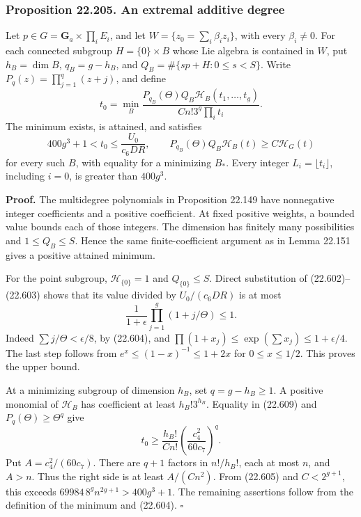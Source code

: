 \documentclass[
  11pt,
  a4paper,
]{article}
\begin{document}
\subsubsection{Proposition 22.205. An extremal additive
degree}\label{proposition-22.205.-an-extremal-additive-degree}

Let \(p\in G=\mathbf G_a\times\prod_iE_i\), and let
\(W=\{z_0=\sum_i\beta_i z_i\}\), with every \(\beta_i\ne0\). For each
connected subgroup \(H=\{0\}\times B\) whose Lie algebra is contained in
\(W\), put \(h_B=\dim B\), \(q_B=g-h_B\), and
\(Q_B=\#\{sp+H:0\le s<S\}\). Write \(P_q(z)=\prod_{j=1}^q(z+j)\), and
define \[
 t_0=\min_B
 \frac{P_{q_B}(\Theta)Q_B\mathcal H_B(t_1,\ldots,t_g)}
                 {C n!3^g\prod_i t_i}.
 \tag{22.608}
\] The minimum exists, is attained, and satisfies \[
 400g^3+1<t_0\le\frac{U_0}{c_6DR},\qquad
 P_{q_B}(\Theta)Q_B\mathcal H_B(t)\ge C\mathcal H_G(t)
 \tag{22.609}
\] for every such \(B\), with equality for a minimizing \(B_*\). Every
integer \(L_i=\lfloor t_i\rfloor\), including \(i=0\), is greater than
\(400g^3\).

\textbf{Proof.} The multidegree polynomials in Proposition 22.149 have
nonnegative integer coefficients and a positive coefficient. At fixed
positive weights, a bounded value bounds each of those integers. The
dimension has finitely many possibilities and \(1\le Q_B\le S\). Hence
the same finite-coefficient argument as in Lemma 22.151 gives a positive
attained minimum.

For the point subgroup, \(\mathcal H_{\{0\}}=1\) and \(Q_{\{0\}}\le S\).
Direct substitution of (22.602)--(22.603) shows that its value divided
by \(U_0/(c_6DR)\) is at most \[
 \frac1{1+\epsilon}\prod_{j=1}^g(1+j/\Theta)\le1.
 \tag{22.610}
\] Indeed \(\sum j/\Theta<\epsilon/8\), by (22.604), and
\(\prod(1+x_j)\le\exp(\sum x_j)\le1+\epsilon/4\). The last step follows
from \(e^x\le(1-x)^{-1}\le1+2x\) for \(0\le x\le1/2\). This proves the
upper bound.

At a minimizing subgroup of dimension \(h_B\), set \(q=g-h_B\ge1\). A
positive monomial of \(\mathcal H_B\) has coefficient at least
\(h_B!3^{h_B}\). Equality in (22.609) and \(P_q(\Theta)\ge\Theta^q\)
give \[
 t_0\ge\frac{h_B!}{Cn!}
                  \left(\frac{c_4^2}{60c_7}\right)^q.
 \tag{22.611}
\] Put \(A=c_4^2/(60c_7)\). There are \(q+1\) factors in \(n!/h_B!\),
each at most \(n\), and \(A>n\). Thus the right side is at least
\(A/(Cn^2)\). From (22.605) and \(C<2^{g+1}\), this exceeds
\(69984\,8^gn^{2g+1}>400g^3+1\). The remaining assertions follow from
the definition of the minimum and (22.604). \(\square\)
\end{document}
